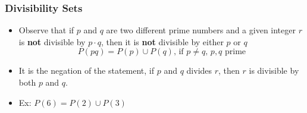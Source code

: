 \documentclass{beamer}
\begin{document}
\begin{frame}
    \frametitle{Divisibility Sets}
    \begin{itemize}
        \item Observe that if $p$ and $q$ are two different prime numbers and a given integer $r$ is \textbf{not} divisible by $p \cdot q$, then it is \textbf{not} divisible by either $p$ or $q$
        \begin{equation*}
            P(pq) = P(p) \cup P(q) \text{, if $p \neq q$, $p,q$ prime}
        \end{equation*}
        \item It is the negation of the statement, if $p$ and $q$ divides $r$, then $r$ is divisible by both $p$ and $q$.
        \item Ex: $P(6) = P(2) \cup P(3)$ %
    \end{itemize}
\end{frame}
\end{document}
